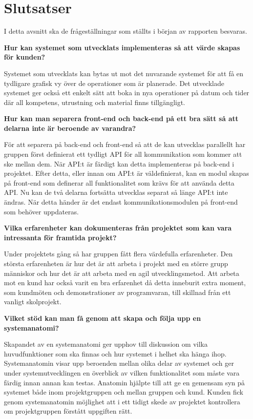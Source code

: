 \chapter{Slutsatser}
I detta avsnitt ska de frågeställningar som ställts i början av rapporten besvaras.

\textbf{Hur kan systemet som utvecklats implementeras så att värde skapas för kunden?}

Systemet som utvecklats kan bytas ut mot det nuvarande systemet för att få en tydligare grafisk vy över de operationer som är planerade. Det utvecklade systemet ger också ett enkelt sätt att boka in nya operationer på datum och tider där all kompetens, utrustning och material finns tillgängligt.

\textbf{Hur kan man separera front-end och back-end på ett bra sätt så att delarna inte är beroende av varandra?}

För att separera på back-end och front-end så att de kan utvecklas parallellt har gruppen först definierat ett tydligt API för all kommunikation som kommer att ske mellan dem. När API:t är färdigt kan detta implementeras på back-end i projektet. Efter detta, eller innan om API:t är väldefinierat, kan en modul skapas på front-end som definerar all funktionalitet som krävs för att använda detta API. Nu kan de två delarna fortsätta utvecklas separat så länge API:t inte ändras. När detta händer är det endast kommunikationsmodulen på front-end som behöver uppdateras.

\textbf{Vilka erfarenheter kan dokumenteras från projektet som kan vara intressanta för framtida projekt?}

Under projektets gång så har gruppen fått flera värdefulla erfarenheter. Den största erfarenheten är hur det är att arbeta i projekt med en större grupp människor och hur det är att arbeta med en agil utvecklingsmetod. Att arbeta mot en kund har också varit en bra erfarenhet då detta inneburit extra moment, som kundmöten och demonstrationer av programvaran, till skillnad från ett vanligt skolprojekt.

\textbf{Vilket stöd kan man få genom att skapa och följa upp en systemanatomi?}

Skapandet av en systemanatomi ger upphov till diskussion om vilka huvudfunktioner som ska finnas och hur systemet i helhet ska hänga ihop. Systemanatomin visar upp beroenden mellan olika delar av systemet och ger under systemutvecklingen en överblick av vilken funktionalitet som måste vara färdig innan annan kan testas. Anatomin hjälpte till att ge en gemensam syn på systemet både inom projektgruppen och mellan gruppen och kund. Kunden fick genom systemanatomin möjlighet att i ett tidigt skede av projektet kontrollera om projektgruppen förstått uppgiften rätt.    
